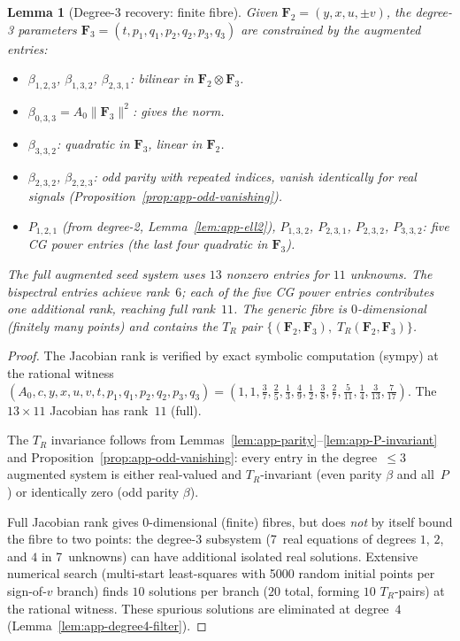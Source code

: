 \documentclass{article}
\newtheorem{lemma}[theorem]{Lemma}
\theoremstyle{definition}
\theoremstyle{remark}
\newcommand{\norm}[1]{\lVert #1 \rVert}
\theoremstyle{definition}
\begin{document}
\begin{lemma}[Degree-3 recovery: finite fibre]\label{lem:app-ell3}
Given $\mathbf{F}_2 = (y,x,u,\pm v)$, the degree-3 parameters
$\mathbf{F}_3 = (t, p_1, q_1, p_2, q_2, p_3, q_3)$ are constrained by the
augmented entries:
\begin{itemize}[nosep]
\item $\beta_{1,2,3}$, $\beta_{1,3,2}$, $\beta_{2,3,1}$: bilinear in
  $\mathbf{F}_2 \otimes \mathbf{F}_3$.
\item $\beta_{0,3,3} = A_0\norm{\mathbf{F}_3}^2$: gives the norm.
\item $\beta_{3,3,2}$: quadratic in $\mathbf{F}_3$, linear in $\mathbf{F}_2$.
\item $\beta_{2,3,2}$, $\beta_{2,2,3}$: odd parity with repeated indices,
  vanish identically for real signals (Proposition~\ref{prop:app-odd-vanishing}).
\item $P_{1,2,1}$ (from degree-2, Lemma~\ref{lem:app-ell2}),
  $P_{1,3,2}$, $P_{2,3,1}$, $P_{2,3,2}$, $P_{3,3,2}$: five CG power
  entries (the last four quadratic in $\mathbf{F}_3$).
\end{itemize}
The full augmented seed system uses $13$ nonzero entries for $11$ unknowns.
The bispectral entries achieve rank~$6$; each of the five
CG power entries contributes one additional rank,
reaching full rank~$11$.
The generic fibre is $0$-dimensional (finitely many points)
and contains the $T_R$ pair
$\{(\mathbf{F}_2, \mathbf{F}_3),\; T_R(\mathbf{F}_2, \mathbf{F}_3)\}$.
\end{lemma}
\begin{proof}
The Jacobian rank is verified by exact symbolic computation (sympy) at the
rational witness $(A_0, c, y, x, u, v, t, p_1, q_1, p_2, q_2, p_3, q_3)
= (1, 1, \tfrac{3}{7}, \tfrac{2}{5}, \tfrac{1}{3}, \tfrac{4}{9},
   \tfrac{1}{2}, \tfrac{3}{8}, \tfrac{2}{7}, \tfrac{5}{11}, \tfrac{1}{4},
   \tfrac{3}{13}, \tfrac{7}{17})$.
The $13 \times 11$ Jacobian has rank~$11$ (full).

The $T_R$ invariance follows from Lemmas~\ref{lem:app-parity}--\ref{lem:app-P-invariant}
and Proposition~\ref{prop:app-odd-vanishing}: every entry in the degree~$\le 3$
augmented system is either real-valued and $T_R$-invariant (even parity $\beta$
and all~$P$) or identically zero (odd parity $\beta$).

Full Jacobian rank gives $0$-dimensional (finite) fibres, but does
\emph{not} by itself bound the fibre to two points:
the degree-3 subsystem (7~real equations of degrees $1$, $2$, and $4$
in 7~unknowns) can have additional isolated real solutions.
Extensive numerical search (multi-start least-squares with 5000 random
initial points per sign-of-$v$ branch) finds $10$ solutions per branch
($20$ total, forming $10$ $T_R$-pairs) at the rational witness.
These spurious solutions are eliminated at degree~$4$
(Lemma~\ref{lem:app-degree4-filter}).
\end{proof}
\end{document}
